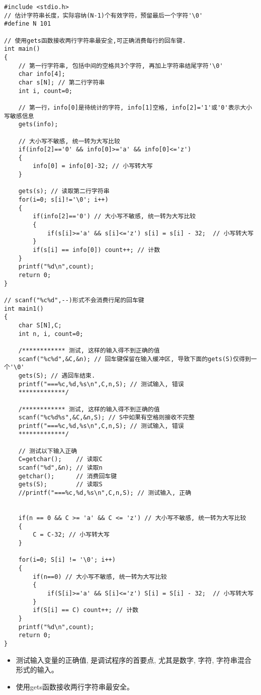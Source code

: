 \begin{lstlisting}
#include <stdio.h>
// 估计字符串长度，实际容纳(N-1)个有效字符，预留最后一个字符'\0'
#define N 101 

// 使用gets函数接收两行字符串最安全,可正确消费每行的回车键.
int main()
{
	// 第一行字符串, 包括中间的空格共3个字符, 再加上字符串结尾字符'\0' 
	char info[4]; 
	char s[N]; // 第二行字符串 
	int i, count=0;
	
	// 第一行，info[0]是待统计的字符, info[1]空格, info[2]='1'或'0'表示大小写敏感信息
	gets(info);  
	
	// 大小写不敏感, 统一转为大写比较 
	if(info[2]=='0' && info[0]>='a' && info[0]<='z') 
	{
		info[0] = info[0]-32; // 小写转大写 
	} 
	
	gets(s); // 读取第二行字符串 
	for(i=0; s[i]!='\0'; i++) 
	{
		if(info[2]=='0') // 大小写不敏感, 统一转为大写比较 
		{
			if(s[i]>='a' && s[i]<='z') s[i] = s[i] - 32;  // 小写转大写 
		}
		if(s[i] == info[0]) count++; // 计数 
	}
	printf("%d\n",count);
	return 0;
} 

// scanf("%c%d",--)形式不会消费行尾的回车键 
int main1()
{
	char S[N],C;
	int n, i, count=0;
	
	/************ 测试, 这样的输入得不到正确的值 
	scanf("%c%d",&C,&n); // 回车键保留在输入缓冲区, 导致下面的gets(S)仅得到一个'\0' 
	gets(S); // 遇回车结束.
	printf("===%c,%d,%s\n",C,n,S); // 测试输入, 错误 
	*************/ 
	
	/************ 测试, 这样的输入得不到正确的值
	scanf("%c%d%s",&C,&n,S); // S中如果有空格则接收不完整 
	printf("===%c,%d,%s\n",C,n,S); // 测试输入, 错误 
	*************/ 
	
	// 测试以下输入正确 
	C=getchar();    // 读取C 
	scanf("%d",&n); // 读取n 
	getchar();      // 消费回车键 
	gets(S);        // 读取S 
	//printf("===%c,%d,%s\n",C,n,S); // 测试输入, 正确 
	
	
	if(n == 0 && C >= 'a' && C <= 'z') // 大小写不敏感, 统一转为大写比较 
	{
		C = C-32; // 小写转大写 
	} 
	
	for(i=0; S[i] != '\0'; i++) 
	{
		if(n==0) // 大小写不敏感, 统一转为大写比较 
		{
			if(S[i]>='a' && S[i]<='z') S[i] = S[i] - 32;  // 小写转大写 
		}
		if(S[i] == C) count++; // 计数 
	}
	printf("%d\n",count);
	return 0;
} 
\end{lstlisting}

\begin{note}[要点]
	\begin{itemize}
		\item 测试输入变量的正确值, 是调试程序的首要点, 尤其是数字, 字符, 字符串混合形式的输入。
		\item 使用gets函数接收两行字符串最安全。
	\end{itemize}
	
\end{note}

